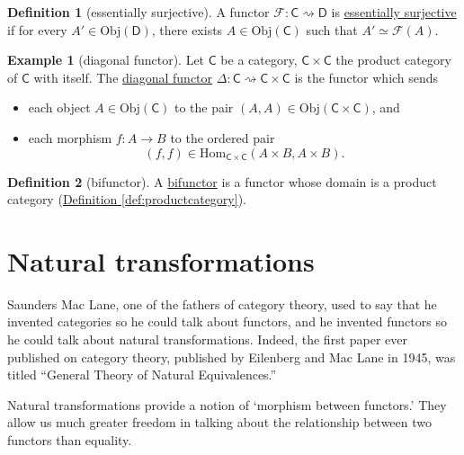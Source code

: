 \documentclass[a4paper]{report}
\newcommand{\defn}[1]{\ul{#1}}
\newcommand{\Obj}{\mathrm{Obj}}
\newcommand{\Hom}{\mathrm{Hom}}
\theoremstyle{definition}
\newtheorem{definition}{Definition}[section]
\newtheorem{example}{Example}[section]
\theoremstyle{plain}
\theoremstyle{remark}
\begin{document}
\begin{definition}[essentially surjective]
  \label{def:essentiallysurjective}
  A functor $\mathcal{F}\colon \mathsf{C} \rightsquigarrow \mathsf{D}$ is \defn{essentially surjective} if for every $A' \in \Obj(\mathsf{D})$, there exists $A \in \Obj(\mathsf{C})$ such that $A' \simeq \mathcal{F}(A)$.
\end{definition}

\begin{example}[diagonal functor]
  \label{eg:diagonalfunctor}
  Let $\mathsf{C}$ be a category, $\mathsf{C} \times \mathsf{C}$ the product category of $\mathsf{C}$ with itself. The \defn{diagonal functor} $\Delta\colon \mathsf{C} \rightsquigarrow \mathsf{C} \times \mathsf{C}$ is the functor which sends 
  \begin{itemize}
    \item each object $A \in \Obj(\mathsf{C})$ to the pair $(A,A) \in \Obj(\mathsf{C} \times \mathsf{C})$, and
    \item each morphism $f\colon A \to B$ to the ordered pair 
      \begin{equation*}
        (f,f) \in \Hom_{\mathsf{C}\times\mathsf{C}}(A\times B,A \times B).
      \end{equation*}
  \end{itemize}
\end{example}

\begin{definition}[bifunctor]
  \label{def:bifunctor}
  A \defn{bifunctor} is a functor whose domain is a product category (\hyperref[def:productcategory]{Definition \ref*{def:productcategory}}).
\end{definition}

\section{Natural transformations} \label{sec:naturaltransformations}
Saunders Mac Lane, one of the fathers of category theory, used to say that he invented categories so he could talk about functors, and he invented functors so he could talk about natural transformations. Indeed, the first paper ever published on category theory, published by Eilenberg and Mac Lane in 1945, was titled ``General Theory of Natural Equivalences.'' \cite{awodey-intro-to-categories}

Natural transformations provide a notion of `morphism between functors.' They allow us much greater freedom in talking about the relationship between two functors than equality.
\end{document}
